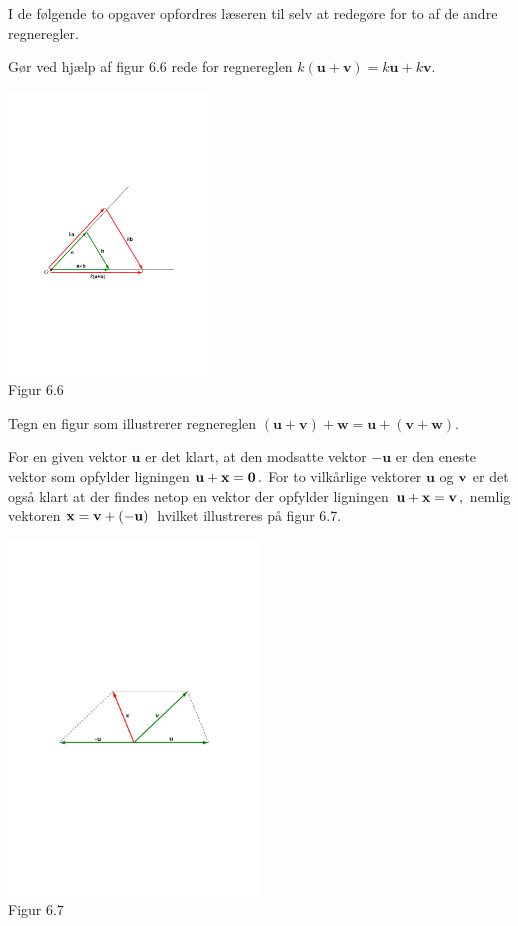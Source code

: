 I de følgende to opgaver opfordres læseren til selv at redegøre for to af de andre regneregler.
 
\begin{exercise}
Gør ved hjælp af figur 6.6 rede for regnereglen $ k(\mathbf u+\mathbf v) = k\mathbf u+ k \mathbf v $.
\begin{center}
		\includegraphics[trim=3.8cm 10cm 6cm 10.5cm,width=0.40\textwidth,clip]{geometer/vektor5.pdf}
		\\Figur 6.6			
\end{center}
\end{exercise}
\begin{exercise}
Tegn en figur som illustrerer regnereglen $ (\mathbf u + \mathbf v ) + \mathbf w = \mathbf u + (\mathbf v + \mathbf w) $.
\end{exercise}

For en given vektor $\mathbf u$ er det klart, at den modsatte vektor $-\mathbf u$ er den eneste vektor som opfylder ligningen $\mathbf u + \mathbf x=\bm{0}\,.$ For to vilkårlige vektorer $\mathbf u$ og $\mathbf{v}$ er det også klart at der findes netop en vektor der opfylder ligningen
$\,\mathbf u + \mathbf{x}=\mathbf{v}\,,$ nemlig vektoren $\mathbf{x}=\mathbf{v}+(-\mathbf u)\,$ hvilket illustreres på figur 6.7.

\begin{center}
		\includegraphics[trim=4cm 12.2cm 4cm 12.2cm,width=0.5\textwidth,clip]{geometer/vektor2subtr.pdf}
		\\Figur 6.7			
\end{center}


